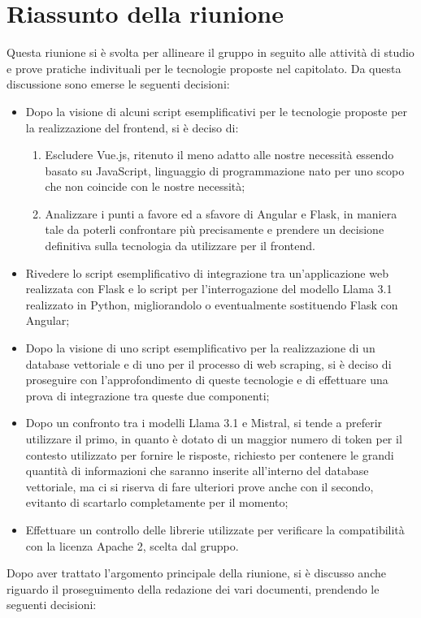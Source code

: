 \section{Riassunto della riunione}
Questa riunione si è svolta per allineare il gruppo in seguito alle attività di studio e prove pratiche indivituali per le tecnologie proposte nel capitolato. Da questa discussione sono emerse le seguenti decisioni:
\begin{itemize}
    \item Dopo la visione di alcuni script esemplificativi per le tecnologie proposte per la realizzazione del frontend, si è deciso di:
    \begin{enumerate}
        \item Escludere Vue.js, ritenuto il meno adatto alle nostre necessità essendo basato su JavaScript, linguaggio di programmazione nato per uno scopo che non coincide con le nostre necessità;
        \item Analizzare i punti a favore ed a sfavore di Angular e Flask, in maniera tale da poterli confrontare più precisamente e prendere un decisione definitiva sulla tecnologia da utilizzare per il frontend. 
    \end{enumerate}
    \item Rivedere lo script esemplificativo di integrazione tra un'applicazione web realizzata con Flask e lo script per l'interrogazione del modello Llama 3.1 realizzato in Python, migliorandolo o eventualmente sostituendo Flask con Angular;
    \item Dopo la visione di uno script esemplificativo per la realizzazione di un database vettoriale e di uno per il processo di web scraping, si è deciso di proseguire con l'approfondimento di queste tecnologie e di effettuare una prova di integrazione tra queste due componenti;
    \item Dopo un confronto tra i modelli Llama 3.1 e Mistral, si tende a preferir utilizzare il primo, in quanto è dotato di un maggior numero di token per il contesto utilizzato per fornire le risposte, richiesto per contenere le grandi quantità di informazioni che saranno inserite all'interno del database vettoriale, ma ci si riserva di fare ulteriori prove anche con il secondo, evitanto di scartarlo completamente per il momento;
    \item Effettuare un controllo delle librerie utilizzate per verificare la compatibilità con la licenza Apache 2, scelta dal gruppo.
\end{itemize}
Dopo aver trattato l'argomento principale della riunione, si è discusso anche riguardo il proseguimento della redazione dei vari documenti, prendendo le seguenti decisioni:
